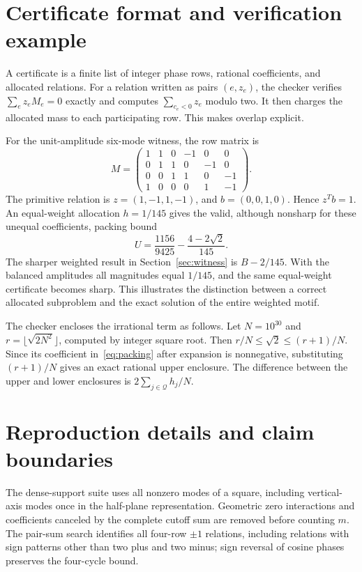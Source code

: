 \documentclass[11pt]{article}
\begin{document}
\section{Certificate format and verification example}\label{app:cert}
A certificate is a finite list of integer phase rows, rational coefficients, and allocated relations. For a relation written as pairs $(e,z_e)$, the checker verifies $\sum_ez_eM_e=0$ exactly and computes $\sum_{c_e<0}z_e$ modulo two. It then charges the allocated mass to each participating row. This makes overlap explicit.

For the unit-amplitude six-mode witness, the row matrix is
\[
 M=\begin{pmatrix}
 1&1&0&-1&0&0\\
 0&1&1&0&-1&0\\
 0&0&1&1&0&-1\\
 1&0&0&0&1&-1
 \end{pmatrix}.
\]
The primitive relation is $z=(1,-1,1,-1)$, and $b=(0,0,1,0)$. Hence $z^Tb=1$. An equal-weight allocation $h=1/145$ gives the valid, although nonsharp for these unequal coefficients, packing bound
\[
 U=\frac{1156}{9425}-\frac{4-2\sqrt2}{145}.
\]
The sharper weighted result in Section~\ref{sec:witness} is $B-2/145$. With the balanced amplitudes all magnitudes equal $1/145$, and the same equal-weight certificate becomes sharp. This illustrates the distinction between a correct allocated subproblem and the exact solution of the entire weighted motif.

The checker encloses the irrational term as follows. Let $N=10^{30}$ and $r=\lfloor\sqrt{2N^2}\rfloor$, computed by integer square root. Then $r/N\le\sqrt2\le(r+1)/N$. Since its coefficient in~\eqref{eq:packing} after expansion is nonnegative, substituting $(r+1)/N$ gives an exact rational upper enclosure. The difference between the upper and lower enclosures is $2\sum_{j\in\mathcal Q}h_j/N$.

\section{Reproduction details and claim boundaries}
The dense-support suite uses all nonzero modes of a square, including vertical-axis modes once in the half-plane representation. Geometric zero interactions and coefficients canceled by the complete cutoff sum are removed before counting $m$. The pair-sum search identifies all four-row $\pm1$ relations, including relations with sign patterns other than two plus and two minus; sign reversal of cosine phases preserves the four-cycle bound.
\end{document}
